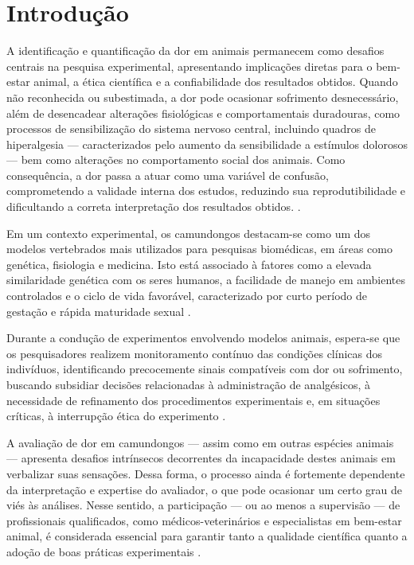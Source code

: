 \chapter[Introdução]{Introdução}

A identificação e quantificação da dor em animais permanecem como desafios centrais na pesquisa experimental, apresentando implicações diretas para o bem-estar animal, a ética científica e a confiabilidade dos resultados obtidos. Quando não reconhecida ou subestimada, a dor pode ocasionar sofrimento desnecessário, além de desencadear alterações fisiológicas e comportamentais duradouras, como processos de sensibilização do sistema nervoso central, incluindo quadros de hiperalgesia — caracterizados pelo aumento da sensibilidade a estímulos dolorosos — bem como alterações no comportamento social dos animais. Como consequência, a dor passa a atuar como uma variável de confusão, comprometendo a validade interna dos estudos, reduzindo sua reprodutibilidade e dificultando a correta interpretação dos resultados obtidos. \cite{turner2019pain, Carbone2011, sneddon2014}. 

Em um contexto experimental, os camundongos destacam-se como um dos modelos vertebrados mais utilizados para pesquisas biomédicas, em áreas como genética, fisiologia e medicina. Isto está associado à fatores como a elevada similaridade genética com os seres humanos, a facilidade de manejo em ambientes controlados e o ciclo de vida favorável, caracterizado por curto período de gestação e rápida maturidade sexual \cite{chorilli2007}.

Durante a condução de experimentos envolvendo modelos animais, espera-se que os pesquisadores realizem monitoramento contínuo das condições clínicas dos indivíduos, identificando precocemente sinais compatíveis com dor ou sofrimento, buscando subsidiar decisões relacionadas à administração de analgésicos, à necessidade de refinamento dos procedimentos experimentais e, em situações críticas, à interrupção ética do experimento \cite{NRC2011Guide}.

A avaliação de dor em camundongos — assim como em outras espécies animais — apresenta desafios intrínsecos decorrentes da incapacidade destes animais em verbalizar suas sensações. Dessa forma, o processo ainda é fortemente dependente da interpretação e expertise do avaliador, o que pode ocasionar um certo grau de viés às análises. Nesse sentido, a participação — ou ao menos a supervisão — de profissionais qualificados, como médicos-veterinários e especialistas em bem-estar animal, é considerada essencial para garantir tanto a qualidade científica quanto a adoção de boas práticas experimentais \cite{concea2019}.

